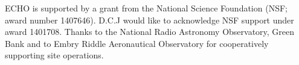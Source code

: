\documentclass[draft,ras]{AGUJournal}
\begin{document}
%
%
%
%
%
%
%


\acknowledgments
ECHO is supported by a grant from the National Science Foundation (NSF; award number 1407646). D.C.J would like to acknowledge NSF support  under award 1401708.
Thanks to the National Radio Astronomy Observatory, Green Bank and to Embry Riddle Aeronautical Observatory for cooperatively supporting site operations.










%
%
%
%
%
%
%
%
%
%
\end{document}
